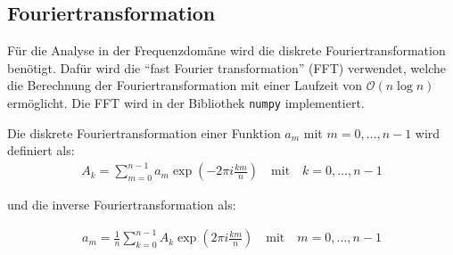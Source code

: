 \documentclass[main.tex]{subfiles}
\begin{document}
\subsection{Fouriertransformation}

Für die Analyse in der Frequenzdomäne wird die diskrete Fouriertransformation
benötigt. Dafür wird die \enquote{fast Fourier transformation} (FFT) verwendet,
welche die Berechnung der Fouriertransformation mit einer Laufzeit von
$\mathcal{O}(n \log n)$ ermöglicht. Die FFT wird in der Bibliothek
\texttt{numpy}\cite{numpy} implementiert.

Die diskrete Fouriertransformation einer Funktion $a_m$ mit $m = 0, \dots, n-1$
wird definiert als:
\begin{align}
    A_k = \sum_{m=0}^{n-1} a_m \exp(-2 \pi i\frac{ k m}{n}) \quad \text{mit}
    \quad k = 0, \dots, n-1
\end{align}

und die inverse Fouriertransformation als:

\begin{align}
    a_m = \frac{1}{n} \sum_{k=0}^{n-1} A_k \exp(2 \pi i\frac{ k m}{n}) \quad
    \text{mit} \quad m = 0, \dots, n-1
\end{align}\cite{numpy-fft}


\end{document}
